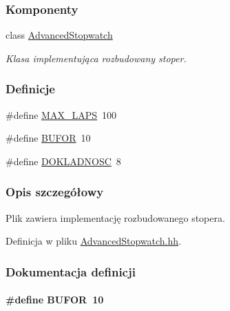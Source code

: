 \subsubsection*{Komponenty}
\begin{DoxyCompactItemize}
\item 
class \hyperlink{class_advanced_stopwatch}{Advanced\-Stopwatch}
\begin{DoxyCompactList}\small\item\em Klasa implementująca rozbudowany stoper. \end{DoxyCompactList}\end{DoxyCompactItemize}
\subsubsection*{Definicje}
\begin{DoxyCompactItemize}
\item 
\#define \hyperlink{_advanced_stopwatch_8hh_a77588e5ce0483d6845d1f5c362111401}{M\-A\-X\-\_\-\-L\-A\-P\-S}~100
\item 
\#define \hyperlink{_advanced_stopwatch_8hh_ab3bb2c4a1622e2f6ae128b969966e848}{B\-U\-F\-O\-R}~10
\item 
\#define \hyperlink{_advanced_stopwatch_8hh_ab44cac363b6642c6f9ba217b1d0172db}{D\-O\-K\-L\-A\-D\-N\-O\-S\-C}~8
\end{DoxyCompactItemize}


\subsubsection{Opis szczegółowy}
Plik zawiera implementację rozbudowanego stopera. 

Definicja w pliku \hyperlink{_advanced_stopwatch_8hh_source}{Advanced\-Stopwatch.\-hh}.



\subsubsection{Dokumentacja definicji}
\hypertarget{_advanced_stopwatch_8hh_ab3bb2c4a1622e2f6ae128b969966e848}{
\paragraph[{B\-U\-F\-O\-R}]{\setlength{\rightskip}{0pt plus 5cm}\#define B\-U\-F\-O\-R~10}}\label{_advanced_stopwatch_8hh_ab3bb2c4a1622e2f6ae128b969966e848}



